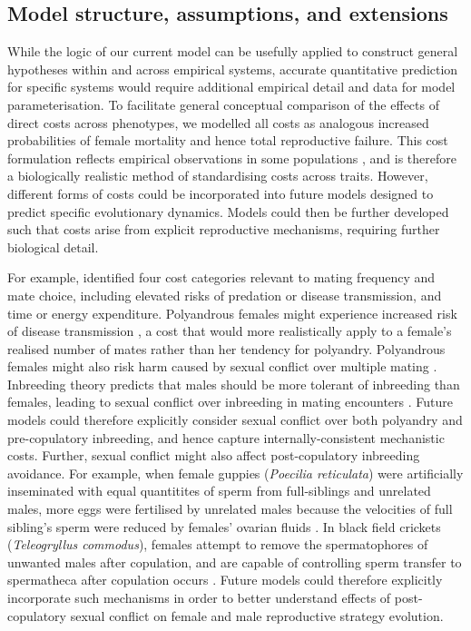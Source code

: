 \documentclass[12pt]{article}
\begin{document}
\subsection*{Model structure, assumptions, and extensions}

While the logic of our current model can be usefully applied to construct general hypotheses within and across empirical systems, accurate quantitative prediction for specific systems would require additional empirical detail and data for model parameterisation. To facilitate general conceptual comparison of the effects of direct costs across phenotypes, we modelled all costs as analogous increased probabilities of female mortality and hence total reproductive failure. This cost formulation reflects empirical observations in some populations \cite[see Model; e.g.,][]{Rowe1994, Koga1998, Gasparini2011}, and is therefore a biologically realistic method of standardising costs across traits. However, different forms of costs could be incorporated into future models designed to predict specific evolutionary dynamics. Models could then be further developed such that costs arise from explicit reproductive mechanisms, requiring further biological detail.

For example, \cite{Pomiankowski1987} identified four cost categories relevant to mating frequency and mate choice, including elevated risks of predation or disease transmission, and time or energy expenditure. Polyandrous females might experience increased risk of disease transmission \cite[][]{Roberts2015a}, a cost that would more realistically apply to a female's realised number of mates rather than her tendency for polyandry. Polyandrous females might also risk harm caused by sexual conflict over multiple mating \cite[e.g.,][]{Arnqvist2005a, Parker2006}. Inbreeding theory predicts that males should be more tolerant of inbreeding than females, leading to sexual conflict over inbreeding in mating encounters \cite[][]{Parker1979, Parker2006, Kokko2006, Duthie2015a}. Future models could therefore explicitly consider sexual conflict over both polyandry and pre-copulatory inbreeding, and hence capture internally-consistent mechanistic costs. Further, sexual conflict might also affect post-copulatory inbreeding avoidance. For example, when female guppies (\textit{Poecilia reticulata}) were artificially inseminated with equal quantitites of sperm from full-siblings and unrelated males, more eggs were fertilised by unrelated males because the velocities of full sibling's sperm were reduced by females' ovarian fluids \cite[][]{Gasparini2011}. In black field crickets (\textit{Teleogryllus commodus}), females attempt to remove the spermatophores of unwanted males after copulation, and are capable of controlling sperm transfer to spermatheca after copulation occurs \cite[][]{Bussiere2006, Tuni2013}. Future models could therefore explicitly incorporate such mechanisms in order to better understand effects of post-copulatory sexual conflict on female and male reproductive strategy evolution.
\end{document}
